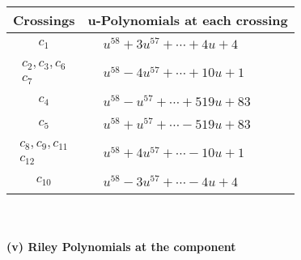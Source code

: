 \documentclass[1p]{elsarticle_modified}
\theoremstyle{definition}
\begin{document}
\begin{tabular}{m{50pt}|m{274pt}}
Crossings & \hspace{64pt}u-Polynomials at each crossing \\
\hline $$\begin{aligned}c_{1}\end{aligned}$$&$\begin{aligned}
&u^{58}+3 u^{57}+\cdots+4 u+4
\end{aligned}$\\
\hline $$\begin{aligned}c_{2},c_{3},c_{6}\\c_{7}\end{aligned}$$&$\begin{aligned}
&u^{58}-4 u^{57}+\cdots+10 u+1
\end{aligned}$\\
\hline $$\begin{aligned}c_{4}\end{aligned}$$&$\begin{aligned}
&u^{58}- u^{57}+\cdots+519 u+83
\end{aligned}$\\
\hline $$\begin{aligned}c_{5}\end{aligned}$$&$\begin{aligned}
&u^{58}+u^{57}+\cdots-519 u+83
\end{aligned}$\\
\hline $$\begin{aligned}c_{8},c_{9},c_{11}\\c_{12}\end{aligned}$$&$\begin{aligned}
&u^{58}+4 u^{57}+\cdots-10 u+1
\end{aligned}$\\
\hline $$\begin{aligned}c_{10}\end{aligned}$$&$\begin{aligned}
&u^{58}-3 u^{57}+\cdots-4 u+4
\end{aligned}$\\
\hline
\end{tabular}\\~\\
\newpage\renewcommand{\arraystretch}{1}
\flushleft \textbf{(v) Riley Polynomials at the component}\newline \\
\end{document}

